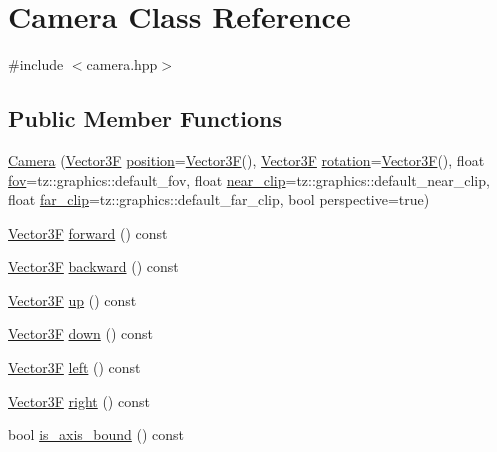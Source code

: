 \hypertarget{class_camera}{}\section{Camera Class Reference}
\label{class_camera}


{\ttfamily \#include $<$camera.\+hpp$>$}

\subsection*{Public Member Functions}
\begin{DoxyCompactItemize}
\item 
\mbox{\hyperlink{class_camera_a2041d5828822b4e012237cda28affb8f}{Camera}} (\mbox{\hyperlink{class_vector3}{Vector3F}} \mbox{\hyperlink{class_camera_a24e0a32af9643efb3e81306e184417ea}{position}}=\mbox{\hyperlink{class_vector3}{Vector3F}}(), \mbox{\hyperlink{class_vector3}{Vector3F}} \mbox{\hyperlink{class_camera_a573539a21c05976f45ca9d1d1fab937d}{rotation}}=\mbox{\hyperlink{class_vector3}{Vector3F}}(), float \mbox{\hyperlink{class_camera_aff7393c9cfbccd7e369091f00008da93}{fov}}=tz\+::graphics\+::default\+\_\+fov, float \mbox{\hyperlink{class_camera_a1a1001125f472d5aff8ca9b27c04675c}{near\+\_\+clip}}=tz\+::graphics\+::default\+\_\+near\+\_\+clip, float \mbox{\hyperlink{class_camera_af93067b3c46c4525dfdf1d192457c277}{far\+\_\+clip}}=tz\+::graphics\+::default\+\_\+far\+\_\+clip, bool perspective=true)
\item 
\mbox{\hyperlink{class_vector3}{Vector3F}} \mbox{\hyperlink{class_camera_a862269b762daf00f14a5926d77331ec9}{forward}} () const
\item 
\mbox{\hyperlink{class_vector3}{Vector3F}} \mbox{\hyperlink{class_camera_afe69d158ab2f83ed2a4376d031efc80b}{backward}} () const
\item 
\mbox{\hyperlink{class_vector3}{Vector3F}} \mbox{\hyperlink{class_camera_adc0b6b6acc31e820f499733a8b242fd6}{up}} () const
\item 
\mbox{\hyperlink{class_vector3}{Vector3F}} \mbox{\hyperlink{class_camera_aac84f1893c5e9d6fba4b808d28a76560}{down}} () const
\item 
\mbox{\hyperlink{class_vector3}{Vector3F}} \mbox{\hyperlink{class_camera_a5321fe15cd196021eea531de71f41e14}{left}} () const
\item 
\mbox{\hyperlink{class_vector3}{Vector3F}} \mbox{\hyperlink{class_camera_a04a615c03274f5a4c7af4164032b24e8}{right}} () const
\item 
bool \mbox{\hyperlink{class_camera_a2c0432bd7e7e47d0e90d0fdf7d99a798}{is\+\_\+axis\+\_\+bound}} () const

\end{DoxyCompactItemize}
